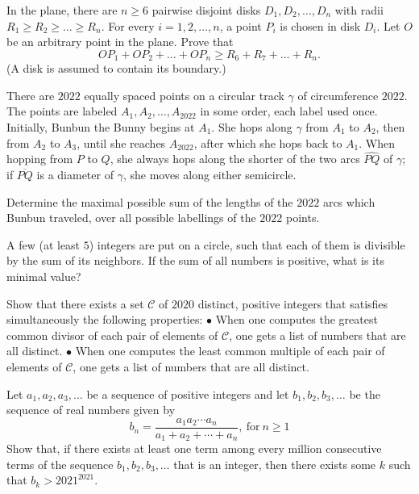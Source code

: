 \documentclass[11pt]{scrartcl}
\begin{document}
\begin{problem}[6654677204410680146]
In the plane, there are $n \geqslant 6$ pairwise disjoint disks $D_{1}, D_{2}, \ldots, D_{n}$ with radii $R_{1} \geqslant R_{2} \geqslant \ldots \geqslant R_{n}$. For every $i=1,2, \ldots, n$, a point $P_{i}$ is chosen in disk $D_{i}$. Let $O$ be an arbitrary point in the plane. Prove that\[O P_{1}+O P_{2}+\ldots+O P_{n} \geqslant R_{6}+R_{7}+\ldots+R_{n}.\](A disk is assumed to contain its boundary.)
\end{problem}
\begin{problem}[2974998787723554962]
	There are $2022$ equally spaced points on a circular track $\gamma$ of circumference $2022$. The points are labeled $A_1, A_2, \ldots, A_{2022}$ in some order, each label used once. Initially, Bunbun the Bunny begins at $A_1$. She hops along $\gamma$ from $A_1$ to $A_2$, then from $A_2$ to $A_3$, until she reaches $A_{2022}$, after which she hops back to $A_1$. When hopping from $P$ to $Q$, she always hops along the shorter of the two arcs $\widehat{PQ}$ of $\gamma$; if $\overline{PQ}$ is a diameter of $\gamma$, she moves along either semicircle.

Determine the maximal possible sum of the lengths of the $2022$ arcs which Bunbun traveled, over all possible labellings of the $2022$ points.
\end{problem}
\begin{problem}[616860610609120]
	A few (at least $5$) integers are put on a circle, such that each of them is divisible by the sum of its neighbors. If the sum of all numbers is positive, what is its minimal value?
\end{problem}
\begin{problem}[5392114638976928066]
	Show that there exists a set $\mathcal{C}$ of $2020$ distinct, positive integers that satisfies simultaneously the following properties:
$\bullet$ When one computes the greatest common divisor of each pair of elements of $\mathcal{C}$, one gets a list of numbers that are all distinct.
$\bullet$ When one computes the least common multiple of each pair of elements of $\mathcal{C}$, one gets a list of numbers that are all distinct.
\end{problem}
\begin{problem}[372825050751557]
Let $a_1,a_2,a_3, \ldots$ be a sequence of positive integers and let $b_1,b_2,b_3,\ldots$ be the sequence of real numbers given by
$$b_n = \dfrac{a_1a_2\cdots a_n}{a_1+a_2+\cdots + a_n},\ \mbox{for}\ n\geq 1$$Show that, if there exists at least one term among every million consecutive terms of the sequence $b_1,b_2,b_3,\ldots$ that is an integer, then there exists some $k$ such that $b_k > 2021^{2021}$.
\end{problem}
\end{document}
